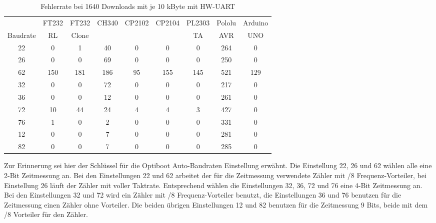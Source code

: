\begin{table}[H]
  \begin{center}
    \begin{tabular}{| c || c | c | c | c | c | c | c | c | }
    \hline
          & FT232 & FT232 & CH340 & CP2102 & CP2104 & PL2303 & Pololu & Arduino \\
 Baudrate & RL    & Clone &       &        &        & TA     & AVR    & UNO     \\
    \hline
    \hline
    22    &  0    &  1    &  40   &   0    &   0    &  0     &  264   &   0    \\
    26    &  0    &  0    &  69   &   0    &   0    &  0     &  250   &   0    \\
    62    &  150  &  181  &  186  &   95   &   155  &  145   &  521   &   129  \\
    \hline
    32    &  0    &  0    &  72   &   0    &   0    &  0     &  217   &   0    \\
    36    &  0    &  0    &  12   &   0    &   0    &  0     &  261   &   0    \\
    72    &  10   &  44   &  24   &   4    &   4    &  3     &  427   &   0    \\
    76    &  1    &  0    &  2    &   0    &   0    &  0     &  331   &   0    \\
    \hline
    12    &  0    &  0    &  7    &   0    &   0    &  0     &  281   &   0    \\
    82    &  0    &  0    &  7    &   0    &   0    &  0     &  285   &   0    \\
    \hline
    \end{tabular}
  \end{center}
  \caption{Fehlerrate bei 1640 Downloads mit je 10 kByte mit HW-UART}
  \label{tab:HWautoErrs}
\end{table}

Zur Erinnerung sei hier der Schlüssel für die Optiboot Auto-Baudraten Einstellung erwähnt.
Die Einstellung 22, 26 und 62 wählen alle eine 2-Bit Zeitmessung an. Bei den Einstellungen
22 und 62 arbeitet der für die Zeitmessung verwendete Zähler mit /8 Frequenz-Vorteiler,
bei Einstellung 26 läuft der Zähler mit voller Taktrate.
Entsprechend wählen die Einstellungen 32, 36, 72 und 76 eine 4-Bit Zeitmessung an.
Bei den Einstellungen 32 und 72 wird ein Zähler mit /8 Frequenz-Vorteiler benutzt,
die Einstellungen 36 und 76 benutzen für die Zeitmessung einen Zähler ohne Vorteiler.
Die beiden übrigen Einstellungen 12 und 82 benutzen für die Zeitmessung 9 Bits,
beide mit dem /8 Vorteiler für den Zähler.\\

